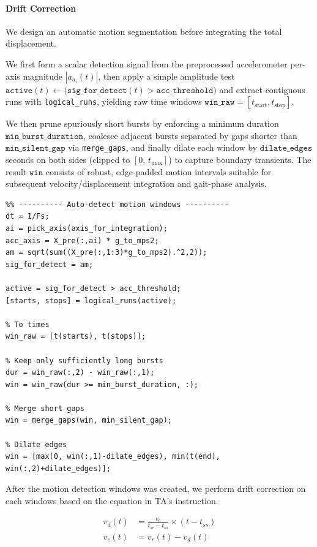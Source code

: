 \documentclass[10pt]{article}
\begin{document}
\paragraph{Drift Correction}

We design an automatic motion segmentation before integrating the total displacement. 

We first form a scalar detection signal from the preprocessed accelerometer per-axis magnitude \(|a_{a_i}(t)|\), 
then apply a simple amplitude test \( \texttt{active}(t) \!\gets\! \big(\texttt{sig\_for\_detect}(t) > \texttt{acc\_threshold}\big) \) and extract contiguous runs with 
\texttt{logical\_runs}, yielding raw time windows \(\texttt{win\_raw}=[t_{\text{start}},t_{\text{stop}}]\). 

We then prune spuriously short bursts by enforcing a minimum duration \(\texttt{min\_burst\_duration}\), coalesce adjacent bursts separated by gaps shorter than 
\(\texttt{min\_silent\_gap}\) via \texttt{merge\_gaps}, and finally dilate each window by \(\texttt{dilate\_edges}\) seconds on both sides (clipped to \([0,\,t_{\max}]\)) to capture boundary transients. The result \(\texttt{win}\) consists of robust, edge-padded motion intervals suitable for subsequent velocity/displacement integration and gait-phase analysis.


\begin{lstlisting}
%% ---------- Auto-detect motion windows ----------
dt = 1/Fs;
ai = pick_axis(axis_for_integration);
acc_axis = X_pre(:,ai) * g_to_mps2;
am = sqrt(sum((X_pre(:,1:3)*g_to_mps2).^2,2)); 
sig_for_detect = am;

active = sig_for_detect > acc_threshold;
[starts, stops] = logical_runs(active);

% To times
win_raw = [t(starts), t(stops)];

% Keep only sufficiently long bursts
dur = win_raw(:,2) - win_raw(:,1);
win = win_raw(dur >= min_burst_duration, :);

% Merge short gaps
win = merge_gaps(win, min_silent_gap);

% Dilate edges
win = [max(0, win(:,1)-dilate_edges), min(t(end), win(:,2)+dilate_edges)];
\end{lstlisting}

After the motion detection windows was created, we perform drift correction on each windows based on the equation in TA's instruction. 

\begin{align}
v_d(t) &= \frac{v_e}{t_{se} - t_{ss}} \times (t - t_{ss}) \\
v_c(t) &= v_r(t) - v_d(t)
\end{align}
\end{document}
